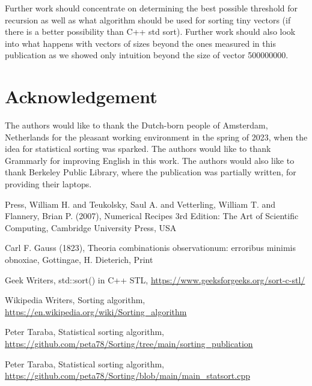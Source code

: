 \documentclass[12pt]{article}
\begin{document}
	Further work should concentrate on determining the best possible threshold for recursion as well as what algorithm should be used for sorting tiny vectors (if there is a better possibility than C++ std sort). Further work should also look into what happens with vectors of sizes beyond the ones measured in this publication as we showed only intuition beyond the size of vector 500000000.
	
	\section*{Acknowledgement}
	
	The authors would like to thank the Dutch-born people of Amsterdam, Netherlands for the pleasant working environment in the spring of 2023, when the idea for statistical sorting was sparked. The authors would like to thank Grammarly for improving English in this work. The authors would also like to thank Berkeley Public Library, where the publication was partially written, for providing their laptops.
	
\begin{thebibliography}{9}
Press, William H. and Teukolsky, Saul A. and Vetterling, William T. and Flannery, Brian P. (2007), Numerical Recipes 3rd Edition: The Art of Scientific Computing, Cambridge University Press, USA

Carl F. Gauss (1823), Theoria combinationis observationum: erroribus minimis obnoxiae, Gottingae, H. Dieterich, Print

Geek Writers, std::sort() in C++ STL, \url{https://www.geeksforgeeks.org/sort-c-stl/}

Wikipedia Writers, Sorting algorithm, \url{https://en.wikipedia.org/wiki/Sorting_algorithm}

Peter Taraba, Statistical sorting algorithm, \url{https://github.com/peta78/Sorting/tree/main/sorting_publication}

Peter Taraba, Statistical sorting algorithm, \url{https://github.com/peta78/Sorting/blob/main/main_statsort.cpp}

\end{thebibliography}

	
	
\end{document}
